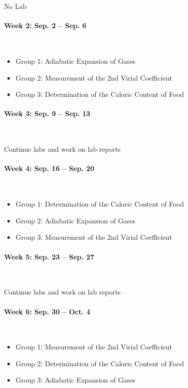 \documentclass[12pt, letterpaper]{article}
\begin{document}
No Lab

\paragraph{Week 2: Sep. 2 -- Sep. 6}~

\begin{itemize}
  \item Group 1: Adiabatic Expansion of Gases
  \item Group 2: Measurement of the 2nd Virial Coefficient
  \item Group 3: Determination of the Caloric Content of Food
\end{itemize}

\paragraph{Week 3: Sep. 9 -- Sep. 13}~

Continue labs and work on lab reports

\paragraph{Week 4: Sep. 16 -- Sep. 20}~

\begin{itemize}
  \item Group 1: Determination of the Caloric Content of Food
  \item Group 2: Adiabatic Expansion of Gases
  \item Group 3: Measurement of the 2nd Virial Coefficient
\end{itemize}

\paragraph{Week 5: Sep. 23 -- Sep. 27}~

Continue labs and work on lab reports

\paragraph{Week 6: Sep. 30 -- Oct. 4}~

\begin{itemize}
  \item Group 1: Measurement of the 2nd Virial Coefficient
  \item Group 2: Determination of the Caloric Content of Food
  \item Group 3: Adiabatic Expansion of Gases
\end{itemize}
\end{document}
